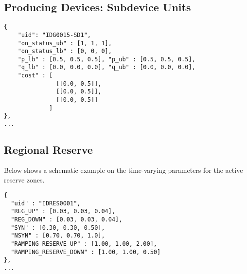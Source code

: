 \subsection{Producing Devices: Subdevice Units}
\label{sec:subdevice_time}
\begin{verbatim}
{
    "uid": "IDG0015-SD1",
    "on_status_ub" : [1, 1, 1],
    "on_status_lb" : [0, 0, 0],
    "p_lb" : [0.5, 0.5, 0.5], "p_ub" : [0.5, 0.5, 0.5],
    "q_lb" : [0.0, 0.0, 0.0], "q_ub" : [0.0, 0.0, 0.0],
    "cost" : [ 
               [[0.0, 0.5]],
               [[0.0, 0.5]],
               [[0.0, 0.5]] 
             ]
}, 
... 
\end{verbatim}

\subsection{Regional Reserve}
\label{sec:reserve_time}
Below shows a schematic example on the time-varying parameters for the active reserve zones. 

\begin{verbatim}
{
  "uid" : "IDRES0001",
  "REG_UP" : [0.03, 0.03, 0.04],
  "REG_DOWN" : [0.03, 0.03, 0.04],
  "SYN" : [0.30, 0.30, 0.50],
  "NSYN" : [0.70, 0.70, 1.0],  
  "RAMPING_RESERVE_UP" : [1.00, 1.00, 2.00],  
  "RAMPING_RESERVE_DOWN" : [1.00, 1.00, 0.50]
},
...
\end{verbatim}

